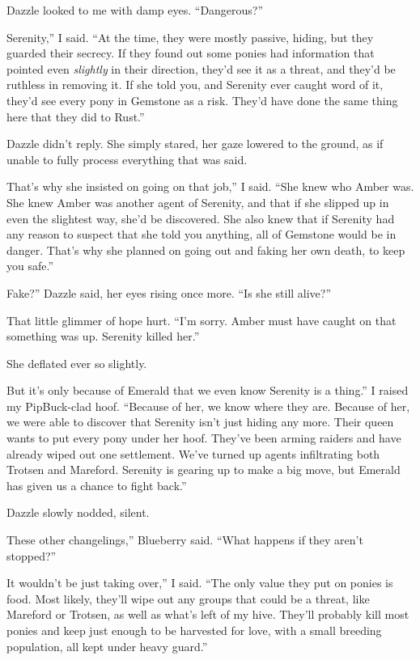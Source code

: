 Dazzle looked to me with damp eyes. “Dangerous?”

\leavevmode{}Serenity,” I said. “At the time, they were mostly passive, hiding, but they guarded their secrecy. If they found out some ponies had information that pointed even \textit{slightly} in their direction, they’d see it as a threat, and they’d be ruthless in removing it. If she told you, and Serenity ever caught word of it, they’d see every pony in Gemstone as a risk. They’d have done the same thing here that they did to Rust.”

Dazzle didn’t reply. She simply stared, her gaze lowered to the ground, as if unable to fully process everything that was said.

\leavevmode{}That’s why she insisted on going on that job,” I said. “She knew who Amber was. She knew Amber was another agent of Serenity, and that if she slipped up in even the slightest way, she’d be discovered. She also knew that if Serenity had any reason to suspect that she told you anything, all of Gemstone would be in danger. That’s why she planned on going out and faking her own death, to keep you safe.”

\leavevmode{}Fake?” Dazzle said, her eyes rising once more. “Is she still alive?”

That little glimmer of hope hurt. “I’m sorry. Amber must have caught on that something was up. Serenity killed her.”

She deflated ever so slightly.

\leavevmode{}But it’s only because of Emerald that we even know Serenity is a thing.” I raised my PipBuck-clad hoof. “Because of her, we know where they are. Because of her, we were able to discover that Serenity isn’t just hiding any more. Their queen wants to put every pony under her hoof. They’ve been arming raiders and have already wiped out one settlement. We’ve turned up agents infiltrating both Trotsen and Mareford. Serenity is gearing up to make a big move, but Emerald has given us a chance to fight back.”

Dazzle slowly nodded, silent.

\leavevmode{}These other changelings,” Blueberry said. “What happens if they aren’t stopped?”

\leavevmode{}It wouldn’t be just taking over,” I said. “The only value they put on ponies is food. Most likely, they’ll wipe out any groups that could be a threat, like Mareford or Trotsen, as well as what’s left of my hive. They’ll probably kill most ponies and keep just enough to be harvested for love, with a small breeding population, all kept under heavy guard.”

